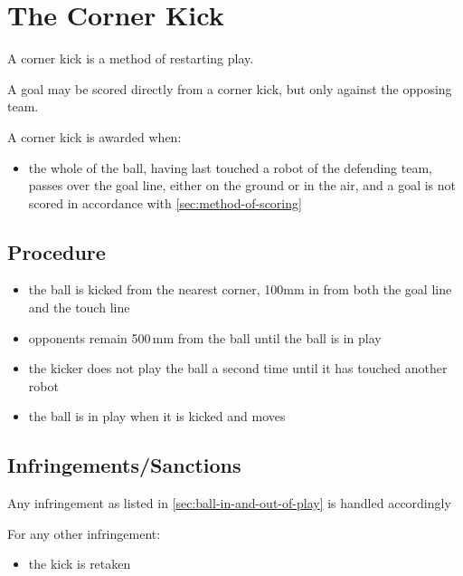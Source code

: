 \section{The Corner Kick}\label{sec:corner-kick}

A corner kick is a method of restarting play.

A goal may be scored directly from a corner kick, but only against the opposing team.

A corner kick is awarded when:

\begin{itemize}
\item the whole of the ball, having last touched a robot of the defending team, passes over the goal line, either on the ground or in the air, and a goal is not scored in accordance with \autoref{sec:method-of-scoring}
\end{itemize}

\subsection{Procedure}
\begin{itemize}
\item the ball is kicked from the nearest corner, 100\added{\,}mm in from both the goal line and the touch line
\item opponents remain 500\,mm from the ball until the ball is in play
\item the kicker does not play the ball a second time until it has touched another robot
\item the ball is in play when it is kicked and moves
\end{itemize}

\subsection{Infringements/Sanctions}
Any infringement as listed in \autoref{sec:ball-in-and-out-of-play} is handled accordingly

For any other infringement:

\begin{itemize}
\item the kick is retaken
\end{itemize}
